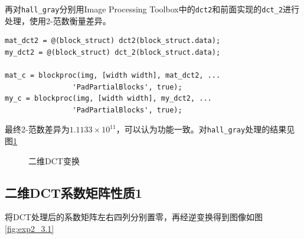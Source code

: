 \documentclass[10pt, a4paper]{article}
\begin{document}
再对\texttt{hall_gray}分别用Image Processing Toolbox中的\texttt{dct2}和前面实现的\texttt{dct_2}进行处理，使用2-范数衡量差异。

\begin{verbatim}
mat_dct2 = @(block_struct) dct2(block_struct.data);
my_dct2 = @(block_struct) dct_2(block_struct.data);

mat_c = blockproc(img, [width width], mat_dct2, ...
                'PadPartialBlocks', true);
my_c = blockproc(img, [width width], my_dct2, ...
                'PadPartialBlocks', true);
\end{verbatim}

最终2-范数差异为$1.1133\times10^{11}$，可以认为功能一致。对\texttt{hall_gray}处理的结果见图\ref{fig:exp2_2}

\begin{figure}[htb!]
    \centering
    \qquad
    \caption{二维DCT变换}
    \label{fig:exp2_2}
\end{figure}

\subsection{二维DCT系数矩阵性质1}\label{sec:2DDCT1}

将DCT处理后的系数矩阵左右四列分别置零，再经逆变换得到图像如图\ref{fig:exp2_3.1}
\end{document}
